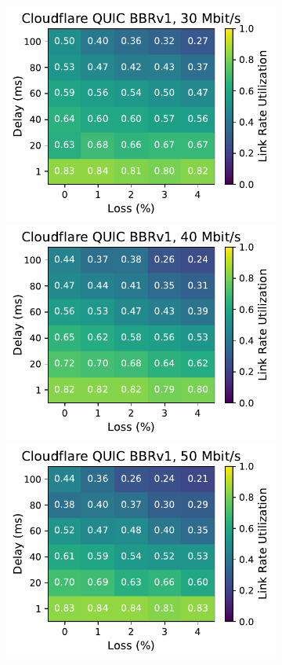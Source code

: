 \begin{figure}[ht]
\begin{subfigure}[b]{0.22\linewidth}
        \includegraphics[width=\linewidth,trim={0 0 2cm 0},clip]{figures/heatmaps/heatmap_quiche_bbr1_30mbps.pdf}
        \includegraphics[width=\linewidth,trim={0 0 2cm 0},clip]{figures/heatmaps/heatmap_quiche_bbr1_40mbps.pdf}
        \includegraphics[width=\linewidth,trim={0 0 2cm 0},clip]{figures/heatmaps/heatmap_quiche_bbr1_50mbps.pdf}

\end{subfigure}
\end{figure}

